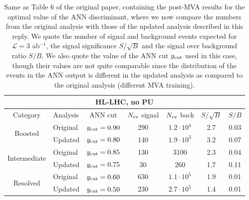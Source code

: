\documentclass[11pt,a4paper]{article}
\begin{document}
\begin{table}[h]
  \centering
  \begin{tabular}{|c|l|c|c|c|c|c|}
    \hline
    \multicolumn{7}{|c|}{HL-LHC, no PU} \\
    \hline
    \hline
    Category  &  Analysis & ANN cut & $N_{\rm ev}$ signal &  $N_{\rm ev}$ back  &  $S/\sqrt{B}$ & $S/B$ \\ 
    \hline
    \hline
    \multirow{2}{*}{Boosted} & Original & $y_{\rm cut}=0.90$ &  290  & $1.2\cdot 10^4$   & 2.7  & 0.03 \\
    & Updated & $y_{\rm cut}=0.80$ & 140    &   $1.9\cdot 10^3$   &  3.2   &  0.07  \\
    \hline
    \hline
    \multirow{2}{*}{Intermediate} &   Original & $y_{\rm cut}=0.85$ & 130  & 3100  & 2.3 & 0.04\\
     &   Updated & $y_{\rm cut}=0.75$ & 30  &  260  & 1.7   & 0.11 \\
    \hline
    \hline
    \multirow{2}{*}{Resolved} & Original  & $y_{\rm cut}=0.60$ & 630 & $1.1\cdot 10^{5}$  & 1.9 & 0.01 \\
        & Updated & $y_{\rm cut}=0.50$ & 230  & $2.7\cdot 10^{5}$   & 1.4  & 0.01  \\
    \hline
      \end{tabular}
  \caption{\small
Same as Table 6 of the original paper, containing the post-MVA
results for the optimal value of the
ANN discriminant, where we now compare the numbers from the original
analysis with those of the updated analysis described in this reply.
    We quote the number of signal and
    background events expected for $\mathcal{L}=3$ ab$^{-1}$,
    the signal significance $S/\sqrt{B}$ and
    the signal over background ratio $S/B$.
    We also quote the value of the ANN cut $y_{\rm cut}$ used in this case, though their
    values are not quite comparable since the distribution of the events in the ANN output
    is different in the updated analysis as compared to the original analysis (different MVA training).
    \label{tab:mva}
  }
\end{table}
\end{document}

